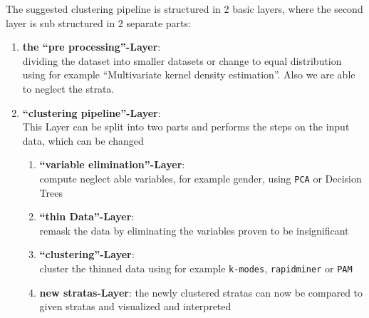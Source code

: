 \documentclass{article}
\begin{document}
	The suggested clustering pipeline is structured in 2 basic layers, where the second layer is sub structured in 2 separate parts:
	\begin{enumerate}
		\item \textbf{the ``pre processing''-Layer}:\\
			dividing the dataset into smaller datasets or change to equal distribution using for example ``Multivariate kernel density estimation''. Also we are able to neglect the strata.
		\item \textbf{``clustering pipeline''-Layer}:\\
			This Layer can be split into two parts and performs the steps on the input data, which can be changed 
			\begin{enumerate}[label=2.\arabic*.]
				\item \textbf{``variable elimination''-Layer}:\\
					compute neglect able variables, for example gender, using \texttt{PCA} or Decision Trees
				\item \textbf{``thin Data''-Layer}:\\
					remask the data by eliminating the variables proven to be insignificant
				\item \textbf{``clustering''-Layer}:\\
					cluster the thinned data using for example \texttt{k-modes}, \texttt{rapidminer} or \texttt{PAM}
				\item \textbf{new stratas-Layer}:
					the newly clustered stratas can now be compared to given stratas and visualized and interpreted
			\end{enumerate}				
	\end{enumerate}
\end{document}
